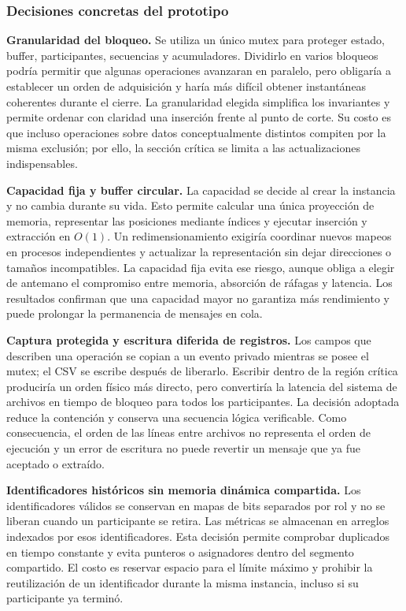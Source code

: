 \documentclass[conference]{IEEEtran}
\begin{document}
\subsubsection{Decisiones concretas del prototipo}
\textbf{Granularidad del bloqueo.} Se utiliza un único mutex para proteger estado, buffer, participantes, secuencias y acumuladores. Dividirlo en varios bloqueos podría permitir que algunas operaciones avanzaran en paralelo, pero obligaría a establecer un orden de adquisición y haría más difícil obtener instantáneas coherentes durante el cierre. La granularidad elegida simplifica los invariantes y permite ordenar con claridad una inserción frente al punto de corte. Su costo es que incluso operaciones sobre datos conceptualmente distintos compiten por la misma exclusión; por ello, la sección crítica se limita a las actualizaciones indispensables.

\textbf{Capacidad fija y buffer circular.} La capacidad se decide al crear la instancia y no cambia durante su vida. Esto permite calcular una única proyección de memoria, representar las posiciones mediante índices y ejecutar inserción y extracción en $O(1)$. Un redimensionamiento exigiría coordinar nuevos mapeos en procesos independientes y actualizar la representación sin dejar direcciones o tamaños incompatibles. La capacidad fija evita ese riesgo, aunque obliga a elegir de antemano el compromiso entre memoria, absorción de ráfagas y latencia. Los resultados confirman que una capacidad mayor no garantiza más rendimiento y puede prolongar la permanencia de mensajes en cola.

\textbf{Captura protegida y escritura diferida de registros.} Los campos que describen una operación se copian a un evento privado mientras se posee el mutex; el CSV se escribe después de liberarlo. Escribir dentro de la región crítica produciría un orden físico más directo, pero convertiría la latencia del sistema de archivos en tiempo de bloqueo para todos los participantes. La decisión adoptada reduce la contención y conserva una secuencia lógica verificable. Como consecuencia, el orden de las líneas entre archivos no representa el orden de ejecución y un error de escritura no puede revertir un mensaje que ya fue aceptado o extraído.

\textbf{Identificadores históricos sin memoria dinámica compartida.} Los identificadores válidos se conservan en mapas de bits separados por rol y no se liberan cuando un participante se retira. Las métricas se almacenan en arreglos indexados por esos identificadores. Esta decisión permite comprobar duplicados en tiempo constante y evita punteros o asignadores dentro del segmento compartido. El costo es reservar espacio para el límite máximo y prohibir la reutilización de un identificador durante la misma instancia, incluso si su participante ya terminó.
\end{document}
